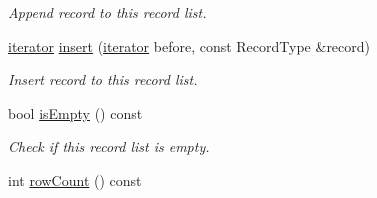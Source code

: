 \begin{DoxyCompactItemize}
\begin{DoxyCompactList}\small\item\em Append record to this record list. \end{DoxyCompactList}\item 
\hyperlink{class_mdt_1_1_plain_text_1_1_record_list_template_a5b0caae56b05a38e53539cad1da8cd12}{iterator} \hyperlink{class_mdt_1_1_plain_text_1_1_record_list_template_ad61ba099c68f630c7d6001fbfd6a277a}{insert} (\hyperlink{class_mdt_1_1_plain_text_1_1_record_list_template_a5b0caae56b05a38e53539cad1da8cd12}{iterator} before, const Record\+Type \&record)
\begin{DoxyCompactList}\small\item\em Insert record to this record list. \end{DoxyCompactList}\item 
bool \hyperlink{class_mdt_1_1_plain_text_1_1_record_list_template_abe112d23858a17cc597d3acebf4b1389}{is\+Empty} () const \hypertarget{class_mdt_1_1_plain_text_1_1_record_list_template_abe112d23858a17cc597d3acebf4b1389}{}\label{class_mdt_1_1_plain_text_1_1_record_list_template_abe112d23858a17cc597d3acebf4b1389}

\begin{DoxyCompactList}\small\item\em Check if this record list is empty. \end{DoxyCompactList}\item 
int \hyperlink{class_mdt_1_1_plain_text_1_1_record_list_template_a04eb7dcdccf22e771d5012d4946cb013}{row\+Count} () const \hypertarget{class_mdt_1_1_plain_text_1_1_record_list_template_a04eb7dcdccf22e771d5012d4946cb013}{}\label{class_mdt_1_1_plain_text_1_1_record_list_template_a04eb7dcdccf22e771d5012d4946cb013}


\end{DoxyCompactItemize}
